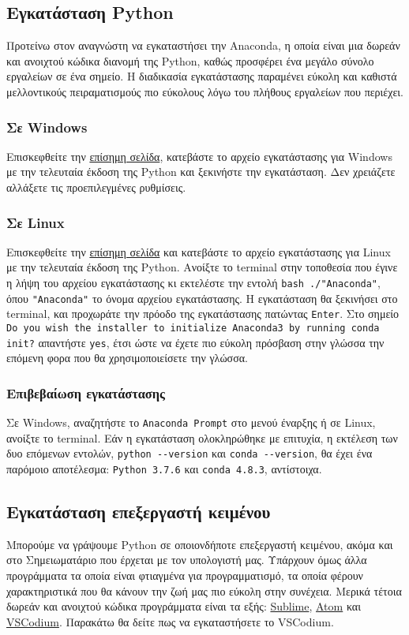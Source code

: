 \documentclass[a4paper,14pt]{extreport}
\begin{document}
\subsection{Εγκατάσταση Python}
Προτείνω στον αναγνώστη να εγκαταστήσει την Anaconda, η οποία είναι μια δωρεάν και  ανοιχτού κώδικα διανομή της Python, καθώς προσφέρει ένα μεγάλο σύνολο εργαλείων σε ένα σημείο. Η διαδικασία εγκατάστασης παραμένει εύκολη και καθιστά μελλοντικούς πειραματισμούς πιο εύκολους λόγω του πλήθους εργαλείων που περιέχει.

\subsubsection{Σε Windows}
Επισκεφθείτε την \href{https://tinyurl.com/yc39u67t}{επίσημη σελίδα}, κατεβάστε το αρχείο εγκατάστασης για Windows με την τελευταία έκδοση της Python και ξεκινήστε την εγκατάσταση. Δεν χρειάζετε αλλάξετε τις προεπιλεγμένες ρυθμίσεις.

\subsubsection{Σε Linux}
Επισκεφθείτε την \href{https://tinyurl.com/yc39u67t}{επίσημη σελίδα} και κατεβάστε το αρχείο εγκατάστασης για Linux με την τελευταία έκδοση της Python. Ανοίξτε το terminal στην τοποθεσία που έγινε η λήψη του αρχείου εγκατάστασης κι εκτελέστε την εντολή \lstinline{bash ./"Anaconda"}, όπου \lstinline{"Anaconda"} το όνομα αρχείου εγκατάστασης. Η εγκατάσταση θα ξεκινήσει στο terminal, και προχωράτε την πρόοδο της εγκατάστασης πατώντας \lstinline{Enter}. Στο σημείο  \lstinline{Do you wish the installer to initialize Anaconda3 by running conda init?} απαντήστε \lstinline{yes}, έτσι ώστε να έχετε πιο εύκολη πρόσβαση στην γλώσσα την επόμενη φορα που θα χρησιμοποιείσετε την γλώσσα.

\subsubsection{Επιβεβαίωση εγκατάστασης}
Σε Windows, αναζητήστε το \lstinline{Anaconda Prompt}
στο μενού έναρξης ή σε Linux, ανοίξτε το terminal.
Εάν η εγκατάσταση ολοκληρώθηκε με επιτυχία, η εκτέλεση των δυο επόμενων
εντολών, \lstinline{python --version} και
\lstinline{conda --version}, θα έχει ένα παρόμοιο
αποτέλεσμα: \lstinline{Python 3.7.6} και
\lstinline{conda 4.8.3}, αντίστοιχα.

\subsection{Εγκατάσταση επεξεργαστή κειμένου}
Μπορούμε να γράψουμε Python σε οποιονδήποτε επεξεργαστή κειμένου, ακόμα και στο Σημειωματάριο που έρχεται με τον υπολογιστή μας. Υπάρχουν όμως άλλα προγράμματα τα οποία είναι φτιαγμένα για προγραμματισμό, τα οποία φέρουν χαρακτηριστικά που θα κάνουν την ζωή μας πιο εύκολη στην συνέχεια. Μερικά τέτοια δωρεάν και ανοιχτού κώδικα προγράμματα είναι τα εξής: \href{https://tinyurl.com/hh3vvrn}{Sublime}, \href{https://tinyurl.com/l2uxckn}{Atom} και \href{https://tinyurl.com/y54gclet}{VSCodium}. Παρακάτω θα δείτε πως να εγκαταστήσετε το VSCodium.
\end{document}
